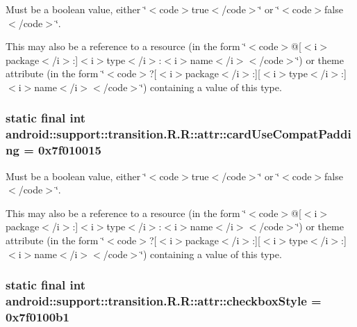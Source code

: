 Must be a boolean value, either \char`\"{}$<$code$>$true$<$/code$>$\char`\"{} or \char`\"{}$<$code$>$false$<$/code$>$\char`\"{}. 

This may also be a reference to a resource (in the form \char`\"{}$<$code$>$@\mbox{[}$<$i$>$package$<$/i$>$:\mbox{]}$<$i$>$type$<$/i$>$:$<$i$>$name$<$/i$>$$<$/code$>$\char`\"{}) or theme attribute (in the form \char`\"{}$<$code$>$?\mbox{[}$<$i$>$package$<$/i$>$:\mbox{]}\mbox{[}$<$i$>$type$<$/i$>$:\mbox{]}$<$i$>$name$<$/i$>$$<$/code$>$\char`\"{}) containing a value of this type. \hypertarget{classandroid_1_1support_1_1transition_1_1_r_1_1attr_442fa91592d471d104e04cc5da4cf41b}{
\subsubsection[{cardUseCompatPadding}]{\setlength{\rightskip}{0pt plus 5cm}static final int android::support::transition.R.R::attr::cardUseCompatPadding = 0x7f010015}}
\label{classandroid_1_1support_1_1transition_1_1_r_1_1attr_442fa91592d471d104e04cc5da4cf41b}


Must be a boolean value, either \char`\"{}$<$code$>$true$<$/code$>$\char`\"{} or \char`\"{}$<$code$>$false$<$/code$>$\char`\"{}. 

This may also be a reference to a resource (in the form \char`\"{}$<$code$>$@\mbox{[}$<$i$>$package$<$/i$>$:\mbox{]}$<$i$>$type$<$/i$>$:$<$i$>$name$<$/i$>$$<$/code$>$\char`\"{}) or theme attribute (in the form \char`\"{}$<$code$>$?\mbox{[}$<$i$>$package$<$/i$>$:\mbox{]}\mbox{[}$<$i$>$type$<$/i$>$:\mbox{]}$<$i$>$name$<$/i$>$$<$/code$>$\char`\"{}) containing a value of this type. \hypertarget{classandroid_1_1support_1_1transition_1_1_r_1_1attr_d7ba7efa2091b1c93bdbec085fe27269}{
\subsubsection[{checkboxStyle}]{\setlength{\rightskip}{0pt plus 5cm}static final int android::support::transition.R.R::attr::checkboxStyle = 0x7f0100b1}}
\label{classandroid_1_1support_1_1transition_1_1_r_1_1attr_d7ba7efa2091b1c93bdbec085fe27269}



